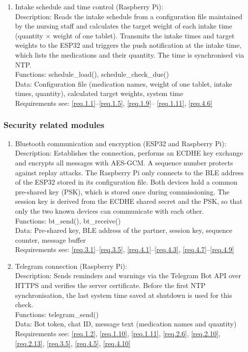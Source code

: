 \begin{enumerate}
		\item Intake schedule and time control (Raspberry Pi): \\
			Description: Reads the intake schedule from a configuration file
			maintained by the nursing staff and calculates the target weight
			of each intake time (quantity $\times$ weight of one tablet).
			Transmits the intake times and target weights to the ESP32 and
			triggers the push notification at the intake time, which lists the
			medications and their quantity. The time is synchronised via NTP. \\
			Functions: schedule\_load(), schedule\_check\_due() \\
			Data: Configuration file (medication names, weight of one tablet,
			intake times, quantity), calculated target weights, system time \\
			Requirements see: \ref{req.1.1}--\ref{req.1.5}, \ref{req.1.9}--
			\ref{req.1.11}, \ref{req.4.6}
	\end{enumerate}

\subsubsection{Security related modules}
	\begin{enumerate}
		\item Bluetooth communication and encryption (ESP32 and
		Raspberry Pi): \\
			Description: Establishes the connection, performs an ECDHE key
			exchange and encrypts all messages with AES-GCM. A sequence number
			protects against replay attacks. The Raspberry Pi only connects to
			the BLE address of the ESP32 stored in its configuration file.
			Both devices hold a common pre-shared key (PSK), which is stored
			once during commissioning. The session key is derived from the
			ECDHE shared secret and the PSK, so that only the two known devices
			can communicate with each other. \\
			Functions: bt\_send(), bt\_receive() \\
			Data: Pre-shared key, BLE address of the partner, session key,
			sequence counter, message buffer \\
			Requirements see: \ref{req.3.1}--\ref{req.3.5}, \ref{req.4.1}--\ref{req.4.3},
			\ref{req.4.7}--\ref{req.4.9}

		\item Telegram connection (Raspberry Pi): \\
			Description: Sends reminders and warnings via the Telegram Bot API
			over HTTPS and verifies the server certificate. Before the first NTP
			synchronisation, the last system time saved at shutdown is used for
			this check. \\
			Functions: telegram\_send() \\
			Data: Bot token, chat ID, message text (medication names and
			quantity) \\
			Requirements see: \ref{req.1.2}, \ref{req.1.10}, \ref{req.1.11}, \ref{req.2.6}, \ref{req.2.10}, \ref{req.2.13}, \ref{req.3.5}, \ref{req.4.5}, \ref{req.4.10}
	\end{enumerate}

